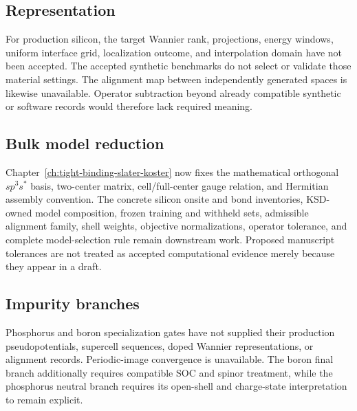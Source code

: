 
\subsection{Representation}

For production silicon, the target Wannier rank, projections, energy windows,
uniform interface grid, localization outcome, and interpolation domain have not
been accepted. The accepted synthetic benchmarks do not select or validate
those material settings. The alignment map between independently generated
spaces is likewise unavailable. Operator subtraction beyond already compatible
synthetic or software records would therefore lack required meaning.

\subsection{Bulk model reduction}

Chapter~\ref{ch:tight-binding-slater-koster} now fixes the mathematical
orthogonal $sp^3s^{\ast}$ basis, two-center matrix, cell/full-center gauge
relation, and Hermitian assembly convention. The concrete silicon onsite and
bond inventories, KSD-owned model composition, frozen training and withheld
sets, admissible alignment family, shell weights, objective normalizations,
operator tolerance, and complete model-selection rule remain downstream work.
Proposed manuscript tolerances are not treated as accepted computational
evidence merely because they appear in a draft.

\subsection{Impurity branches}

Phosphorus and boron specialization gates have not supplied their production
pseudopotentials, supercell sequences, doped Wannier representations, or
alignment records. Periodic-image convergence is unavailable. The boron final
branch additionally requires compatible SOC and spinor treatment, while the
phosphorus neutral branch requires its open-shell and charge-state
interpretation to remain explicit.

